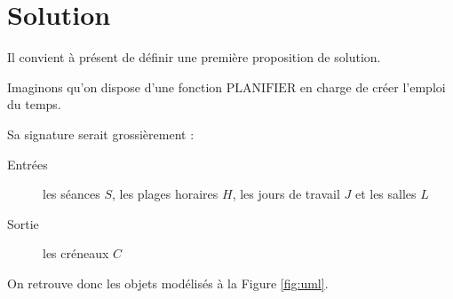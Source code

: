 
\section{Solution}

Il convient à présent de définir une première proposition de solution.

Imaginons qu’on dispose d’une fonction $\text{PLANIFIER}$ en charge de créer
l’emploi du temps.

Sa signature serait grossièrement :

\begin{description}

\item[Entrées] les séances $S$, les plages horaires $H$, les jours de
travail $J$ et les salles $L$
\item[Sortie] les créneaux $C$

\end{description}

On retrouve donc les objets modélisés à la Figure \ref{fig:uml}.

